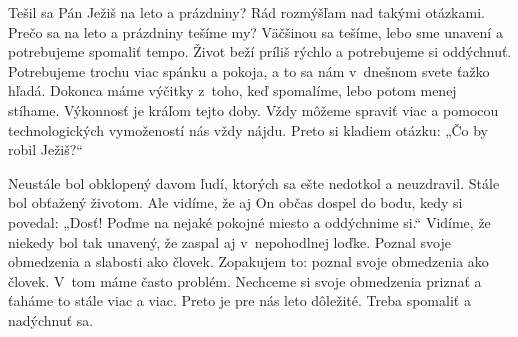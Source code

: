 







Tešil sa Pán Ježiš na leto a prázdniny? Rád rozmýšľam nad takými otázkami. Prečo sa na leto a prázdniny tešíme my? Väčšinou sa tešíme, lebo sme unavení a potrebujeme spomaliť tempo. Život beží príliš rýchlo a potrebujeme si oddýchnuť. Potrebujeme trochu viac spánku a pokoja, a to sa nám v~dnešnom svete ťažko hľadá. Dokonca máme výčitky z~toho, keď spomalíme, lebo potom menej stíhame. Výkonnosť je kráľom tejto doby. Vždy môžeme spraviť viac a pomocou technologických vymožeností nás vždy nájdu. Preto si kladiem otázku: „Čo by robil Ježiš?“

Neustále bol obklopený davom ľudí, ktorých sa ešte nedotkol a neuzdravil. Stále bol obťažený životom. Ale vidíme, že aj On občas dospel do bodu, kedy si povedal: „Dosť! Poďme na nejaké pokojné miesto a oddýchnime si.“ Vidíme, že niekedy bol tak unavený, že zaspal aj v~nepohodlnej loďke. Poznal svoje obmedzenia a slabosti ako človek. Zopakujem to: poznal svoje obmedzenia ako človek. V~tom máme často problém. Nechceme si svoje obmedzenia priznať a ťaháme to stále viac a viac. Preto je pre nás leto dôležité. Treba spomaliť a nadýchnuť sa.

